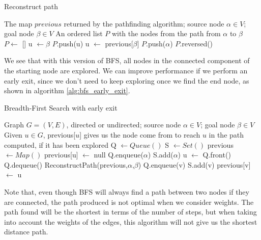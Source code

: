 \documentclass[12pt]{report}
\begin{document}
\begin{algorithm}
\caption{Reconstruct path}
\label{alg:reconstruct}
\begin{algorithmic}[1]
\Require The map $previous$ returned by the pathfinding algorithm; source node $\alpha \in V$; goal node $\beta \in V$
\Ensure An ordered list $P$ with the nodes from the path from $\alpha$ to $\beta$
\State $P \gets$ []  
\State u $\gets \beta$
	\State $P$.push(u)
	\State u $\gets$ previous[$\beta$]
\EndWhile
\State $P$.push($\alpha$)
\State \Return $P$.reversed()
\EndProcedure
\end{algorithmic}
\end{algorithm}

We see that with this version of BFS, all nodes in the connected component of the starting node are explored. We can improve performance if we perform an early exit, since we don't need to keep exploring once we find the end node, as shown in algorithm \ref{alg:bfs_early_exit}.

\begin{algorithm}
\caption{Breadth-First Search with early exit}
\label{alg:bfs_early_exit}
\begin{algorithmic}[1]
\Require Graph $G = (V, E)$, directed or undirected; source node $\alpha \in V$; goal node $\beta \in V$
\Ensure Given $u \in G$, previous[$u$] gives us the node come from to reach $u$ in the path computed, if it has been explored
\State Q $\gets Queue()$
\State S $\gets Set()$
\State previous $\gets Map()$
	\State previous[u] $\gets$ null
\EndFor
\State Q.enqueue($\alpha$)
\State S.add($\alpha$)
	\State u $\gets$ Q.front()
	\State Q.dequeue()
			 
				\State \Return ReconstructPath(previous,$\alpha$,$\beta$)
			\EndIf
			\State Q.enqueue(v)
			\State S.add(v)
			\State previous[v] $\gets$ u
		\EndIf
	\EndFor
\EndWhile
\EndProcedure
\end{algorithmic}
\end{algorithm}

Note that, even though BFS will always find a path between two nodes if they are connected, the path produced is not optimal when we consider weights. The path found will be the shortest in terms of the number of steps, but when taking into account the weights of the edges, this algorithm will not give us the shortest distance path.
\end{document}
